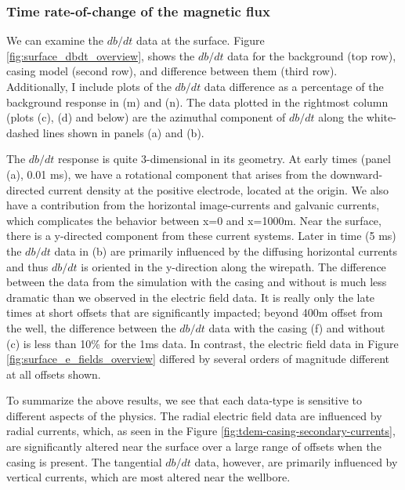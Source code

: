 \subsubsection{Time rate-of-change of the magnetic flux}

We can examine the $db/dt$ data at the surface. Figure \ref{fig:surface_dbdt_overview}, shows the $db/dt$ data for the background (top row), casing model (second row), and difference between them (third row). Additionally, I include plots of the $db/dt$ data difference as a percentage of the background response in (m) and (n). The data plotted in the rightmost column (plots (c), (d) and below) are the azimuthal component of $db/dt$ along the white-dashed lines shown in panels (a) and (b).





The $db/dt$ response is quite 3-dimensional in its geometry. At early times (panel (a), 0.01 ms), we have a rotational component that arises from the downward-directed current density at the positive electrode, located at the origin. We also have a contribution from the horizontal image-currents and galvanic currents, which complicates the behavior between x=0 and x=1000m. Near the surface, there is a y-directed component from these current systems. Later in time (5 ms) the $db/dt$ data in (b) are primarily influenced by the diffusing horizontal currents and thus $db/dt$ is oriented in the y-direction along the wirepath. The difference between the data from the simulation with the casing and without is much less dramatic than we observed in the electric field data. It is really only the late times at short offsets that are significantly impacted; beyond 400m offset from the well, the difference between the $db/dt$ data with the casing (f) and without (c) is less than 10\% for the 1ms data. In contrast, the electric field data in Figure \ref{fig:surface_e_fields_overview} differed by several orders of magnitude different at all offsets shown.

To summarize the above results, we see that each data-type is sensitive to different aspects of the physics. The radial electric field data are influenced by radial currents, which, as seen in the Figure \ref{fig:tdem-casing-secondary-currents}, are significantly altered near the surface over a large range of offsets when the casing is present. The tangential $db/dt$ data, however, are primarily influenced by vertical currents, which are most altered near the wellbore.


